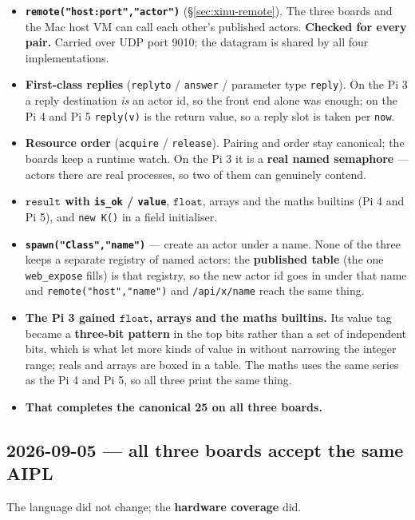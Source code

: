 \documentclass[11pt,a4paper]{article}
\newcommand{\ty}[1]{\ensuremath{\mathtt{#1}}}
\begin{document}
\begin{itemize}
\item \textbf{\texttt{remote("host:port","actor")}} (\S\ref{sec:xinu-remote}).
  The three boards and the Mac host VM can call each other's published actors.
  \textbf{Checked for every pair.} Carried over UDP port 9010; the datagram is
  shared by all four implementations.
\item \textbf{First-class replies} (\texttt{replyto} / \texttt{answer} /
  parameter type \texttt{reply}). On the Pi 3 a reply destination \emph{is} an
  actor id, so the front end alone was enough; on the Pi 4 and Pi 5
  \texttt{reply(v)} is the return value, so a reply slot is taken per
  \texttt{now}.
\item \textbf{Resource order} (\texttt{acquire} / \texttt{release}). Pairing and
  order stay canonical; the boards keep a runtime watch. On the Pi 3 it is a
  \textbf{real named semaphore} --- actors there are real processes, so two of
  them can genuinely contend.
\item \textbf{\ty{result} with \texttt{is\_ok} / \texttt{value}}, \ty{float},
  arrays and the maths builtins (Pi 4 and Pi 5), and \texttt{new K()} in a field
  initialiser.
\item \textbf{\texttt{spawn("Class","name")}} --- create an actor under a name.
  None of the three keeps a separate registry of named actors: the
  \textbf{published table} (the one \texttt{web\_expose} fills) is that registry,
  so the new actor id goes in under that name and
  \texttt{remote("host","name")} and \texttt{/api/x/name} reach the same thing.
\item \textbf{The Pi 3 gained \ty{float}, arrays and the maths builtins.} Its
  value tag became a \textbf{three-bit pattern} in the top bits rather than a set
  of independent bits, which is what let more kinds of value in without narrowing
  the integer range; reals and arrays are boxed in a table. The maths uses the
  same series as the Pi 4 and Pi 5, so all three print the same thing.
\item \textbf{That completes the canonical 25 on all three boards.}
\end{itemize}

\subsection*{2026-09-05 --- all three boards accept the same AIPL}

The language did not change; the \textbf{hardware coverage} did.
\end{document}
